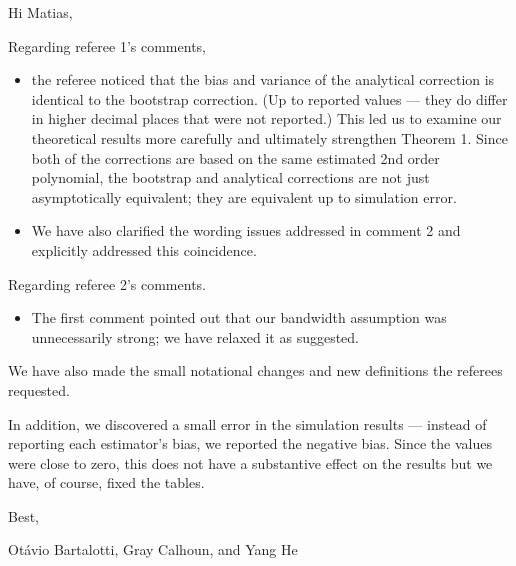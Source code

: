 \documentclass[12pt,fleqn]{article}
\begin{document}
\noindent%
Hi Matias,

\strut

Regarding referee 1's comments,
\begin{itemize}
\item the referee noticed that the bias and variance of the analytical
  correction is identical to the bootstrap correction. (Up to reported
  values --- they do differ in higher decimal places that were not
  reported.) This led us to examine our theoretical results more
  carefully and ultimately strengthen Theorem 1. Since both of the
  corrections are based on the same estimated 2nd order polynomial,
  the bootstrap and analytical corrections are not just asymptotically
  equivalent; they are equivalent up to simulation error.
\item We have also clarified the wording issues addressed in comment 2
  and explicitly addressed this coincidence.
\end{itemize}
Regarding referee 2's comments.
\begin{itemize}
\item The first comment pointed out that our bandwidth assumption was
  unnecessarily strong; we have relaxed it as suggested.
\end{itemize}
We have also made the small notational changes and new definitions
the referees requested.

In addition, we discovered a small error in the simulation results ---
instead of reporting each estimator's bias, we reported the negative
bias. Since the values were close to zero, this does not have a
substantive effect on the results but we have, of course, fixed the
tables.

\noindent%
Best,

\noindent%
Ot\'avio Bartalotti, Gray Calhoun, and Yang He
\end{document}
